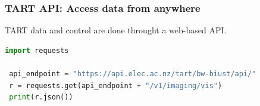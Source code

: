 \documentclass[ignorenonframetext]{beamer}
\begin{document}
\begin{frame}[containsverbatim]
\frametitle{TART API: Access data from anywhere}
TART data and control are done throught a web-based API. 


\begin{lstlisting}[language=Python, frame=single, basicstyle=\footnotesize]
 import requests
 
 api_endpoint = "https://api.elec.ac.nz/tart/bw-biust/api/"
 r = requests.get(api_endpoint + "/v1/imaging/vis")
 print(r.json())
\end{lstlisting}

\end{frame}

% 
% 
% 

\end{document}
